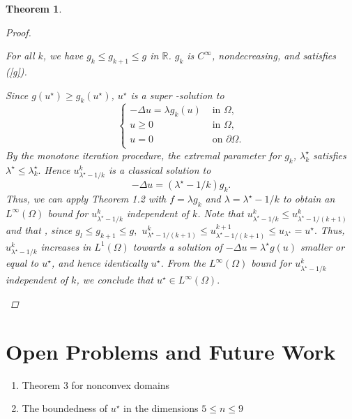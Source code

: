 \documentclass[paper=a4, fontsize=11pt]{scrartcl} %
\numberwithin{equation}{section} %
\numberwithin{figure}{section} %
\numberwithin{table}{section} %
\newtheorem{theorem}{Theorem}
\numberwithin{exercise}{section}
\begin{document}
\begin{theorem}
\begin{proof}
\begin{enumerate}
For all $k$, we have $g_k\leq g_{k+1}\leq g$ in $\mathbb{R}$. $g_k$ is $C^\infty$, nondecreasing, and satisfies (\ref{g}).

Since $g(u^\star)\geq g_k(u^\star)$, $u^\star$ is a super -solution to 
$$\begin{cases} -\Delta u=\lambda g_k(u) & \mbox{ in } \Omega,\\
u\geq 0 &\mbox{ in } \Omega,\\
u= 0 &\mbox{ on } \partial\Omega.\\
\end{cases}$$
By the monotone iteration procedure, the extremal parameter for $g_k$, $\lambda_k^\star$ satisfies $\lambda^\star\leq \lambda_{k}^{\star}.$ Hence $u_{\lambda^{\star} -1/k}^k$ is a classical solution to $$-\Delta u=(\lambda^{\star} -1/k)g_k.$$
Thus, we can apply Theorem 1.2 with $f=\lambda g_k$ and $\lambda=\lambda^{\star}-1/k $ to obtain an $L^\infty(\Omega)$ bound for $u_{\lambda^{\star}-1/k}^{k}$ independent of $k$. Note that $u_{\lambda^{\star}-1/k}^{k}\leq u_{\lambda^{\star}-1/(k+1)}^{k}$  and that , since $g_l\leq g_{k+1}\leq g,$ $ u_{\lambda^{\star}-1/(k+1)}^{k}\leq u_{\lambda^{\star}-1/(k+1)}^{k+1}\leq u_{\lambda^{\star}}=u^\star.$ Thus, $u_{\lambda^{\star}-1/k}^k$ increases in $L^1(\Omega)$ towards a solution of  $-\Delta u=\lambda^\star g(u)$ smaller or equal to $u^\star$, and hence identically $u^\star$. From the $L^\infty(\Omega)$ bound for $u_{\lambda^\star-1/k}^k$ independent of $k$, we conclude that $u^\star\in L^\infty(\Omega).$
\end{enumerate}
\end{proof}
\end{theorem}

\section{Open Problems and Future Work}
\begin{enumerate}
\item Theorem 3 for nonconvex domains
\item The boundedness of $u^{\star}$ in the dimensions $5\leq n\leq 9$ 
\end{enumerate}
\end{document}
